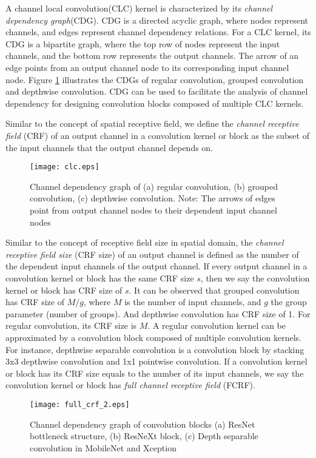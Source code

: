\documentclass[10pt,twocolumn,letterpaper]{article}
\begin{document}
A channel local convolution(CLC) kernel is characterized by its \textit{channel dependency graph}(CDG). CDG is a directed acyclic graph, where nodes represent channels, and edges represent channel dependency relations. For a CLC kernel, its CDG is a bipartite graph, where the top row of nodes represent the input channels, and the bottom row represents the output channels. The arrow of an edge points from an output channel node to its corresponding input channel node. Figure \ref{fig:clc} illustrates the CDGs of regular convolution, grouped convolution and depthwise convolution. CDG can be used to facilitate the analysis of channel dependency for designing convolution blocks composed of multiple CLC kernels.

Similar to the concept of spatial receptive field, we define the \textit{channel receptive field } (CRF) of an output channel in a convolution kernel or block as the subset of the input channels that the output channel depends on. 
\begin{figure}[t!]
\begin{center}
\texttt{[image: clc.eps]}
\end{center}
\caption{Channel dependency graph of (a) regular convolution, (b) grouped convolution, (c) depthwise convolution. Note: The arrows of edges point from output channel nodes to their dependent input channel nodes}
\label{fig:clc}
\end{figure}
Similar to the concept of receptive field size in spatial domain, the \textit{channel receptive field size} (CRF size) of an output channel is defined as the number of the dependent input channels of the output channel. If every output channel in a convolution kernel or block has the same CRF size $s$, then we say the convolution kernel or block has CRF size of $s$. It can be observed that grouped convolution has CRF size of $M/g$, where $M$ is the number of input channels, and $g$ the group parameter (number of groups). And depthwise convolution has CRF size of 1. For regular convolution, its CRF size is $M$. A regular convolution kernel can be approximated by a convolution block composed of multiple convolution kernels. For instance, depthwise separable convolution is a convolution block by stacking 3x3 depthwise convolution and 1x1 pointwise convolution. If a convolution kernel or block has its CRF size equals to the number of its input channels, we say the convolution kernel or block has \textit{full channel receptive field} (FCRF). 

\begin{figure}[b!]
\begin{center}
\texttt{[image: full\_crf\_2.eps]}
\end{center}
   \caption{Channel dependency graph of convolution blocks (a) ResNet bottleneck structure\cite{resnet2016he}, (b) ResNeXt block\cite{resnext2016saining}, (c) Depth separable convolution in MobileNet\cite{mobilenet2017howard} and Xception\cite{xception2017chollet} }
\label{fig:fcrf}
\end{figure}
\end{document}

